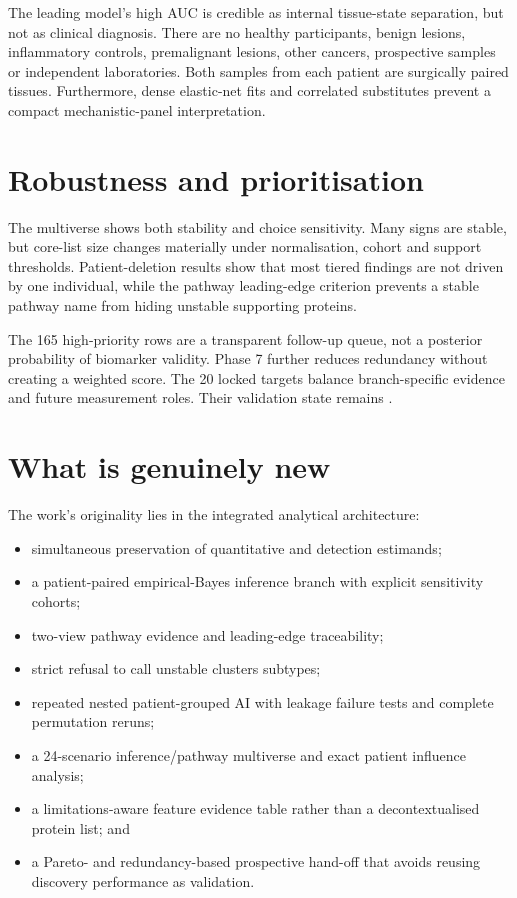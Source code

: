 The leading model's high AUC is credible as internal tissue-state separation, but not as clinical diagnosis. There are no healthy participants, benign lesions, inflammatory controls, premalignant lesions, other cancers, prospective samples or independent laboratories. Both samples from each patient are surgically paired tissues. Furthermore, dense elastic-net fits and correlated substitutes prevent a compact mechanistic-panel interpretation.

\section{Robustness and prioritisation}
\label{sec:robustness_and_prioritisation}

The multiverse shows both stability and choice sensitivity. Many signs are stable, but core-list size changes materially under normalisation, cohort and support thresholds. Patient-deletion results show that most tiered findings are not driven by one individual, while the pathway leading-edge criterion prevents a stable pathway name from hiding unstable supporting proteins.

The 165 high-priority rows are a transparent follow-up queue, not a posterior probability of biomarker validity. Phase 7 further reduces redundancy without creating a weighted score. The 20 locked targets balance branch-specific evidence and future measurement roles. Their validation state remains .

\section{What is genuinely new}
\label{sec:what_is_genuinely_new}

The work's originality lies in the integrated analytical architecture:

\begin{itemize}
\item simultaneous preservation of quantitative and detection estimands;
\item a patient-paired empirical-Bayes inference branch with explicit sensitivity cohorts;
\item two-view pathway evidence and leading-edge traceability;
\item strict refusal to call unstable clusters subtypes;
\item repeated nested patient-grouped AI with leakage failure tests and complete permutation reruns;
\item a 24-scenario inference/pathway multiverse and exact patient influence analysis;
\item a limitations-aware feature evidence table rather than a decontextualised protein list; and
\item a Pareto- and redundancy-based prospective hand-off that avoids reusing discovery performance as validation.
\end{itemize}
